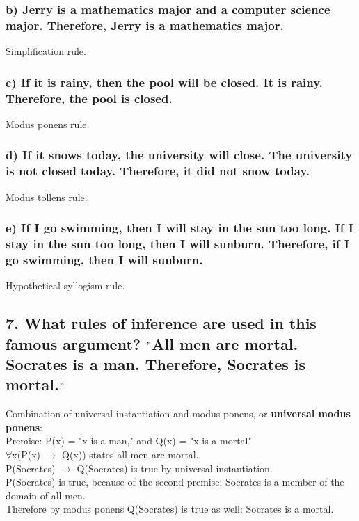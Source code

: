 \documentclass[11pt, oneside]{article} %
\numberwithin{equation}{section} %
\numberwithin{figure}{section} %
\numberwithin{table}{section} %
\begin{document}
\subsubsection{b) Jerry is a mathematics major and a computer science
major. Therefore, Jerry is a mathematics major.}
Simplification rule.
\subsubsection{c) If it is rainy, then the pool will be closed. It is rainy.
Therefore, the pool is closed.}
Modus ponens rule.
\subsubsection{d) If it snows today, the university will close. The university is not closed today. Therefore, it did not snow today.}
Modus tollens rule.
\subsubsection{e) If I go swimming, then I will stay in the sun too long.
If I stay in the sun too long, then I will sunburn. Therefore, if I go swimming, then I will sunburn.}
Hypothetical syllogism rule.

\subsection{7. What rules of inference are used in this famous argument? $"$All men are mortal. Socrates is a man. Therefore, Socrates is mortal.$"$}
Combination of universal instantiation and modus ponens, or \textbf{universal modus ponens}: \\
Premise: P(x) = "x is a man," and Q(x) = "x is a mortal" \\
$\forall$x(P(x) $\rightarrow$ Q(x)) states all men are mortal. \\
P(Socrates) $\rightarrow$ Q(Socrates) is true by universal instantiation. \\
P(Socrates) is true, because of the second premise: Socrates is a member of the domain of all men. \\
Therefore by modus ponens Q(Socrates) is true as well: Socrates is a mortal. 

\end{document}
